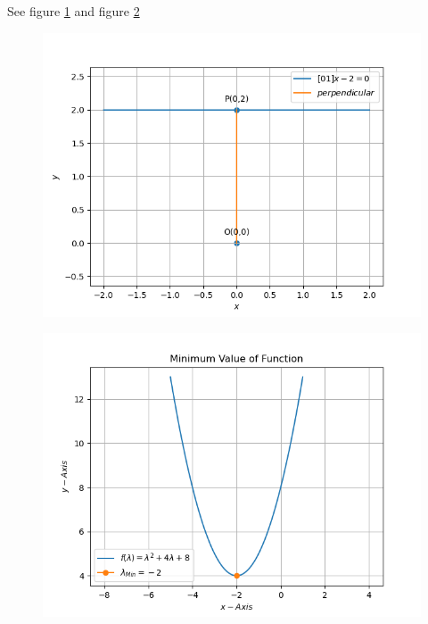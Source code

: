 \documentclass[12pt]{article}
\begin{document}
See figure \ref{fig:11/10/3/3/2/grad/Fig1} and figure \ref{fig:11/10/3/3/2/grad/Fig2}
\begin{figure}[!h]
	\begin{center} 
	    \includegraphics[width=\columnwidth]{11/10/3/3/2/grad/figs/opt1}
	\end{center}
\caption{}
\label{fig:11/10/3/3/2/grad/Fig1}
\end{figure}
\begin{figure}[!h]
	\begin{center} 
	    \includegraphics[width=\columnwidth]{11/10/3/3/2/grad/figs/opt2}
	\end{center}
\caption{}
\label{fig:11/10/3/3/2/grad/Fig2}
\end{figure}
\end{document}
